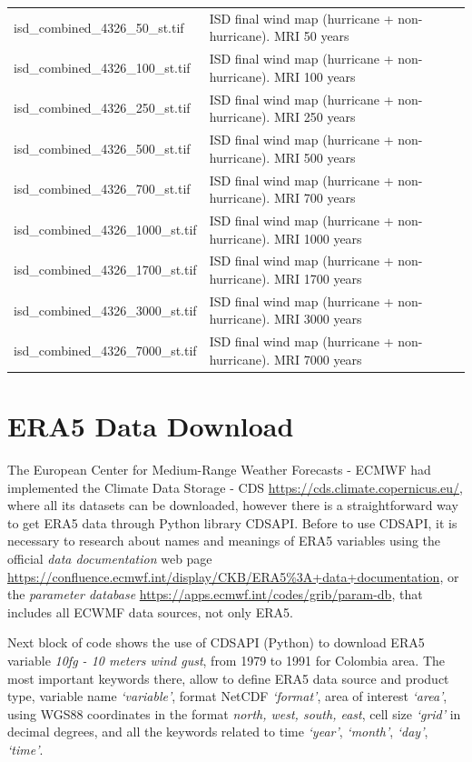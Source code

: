 \documentclass[12pt,oneside]{reedthesis}
\begin{document}
\begin{longtable}[t]{>{\raggedright\arraybackslash}p{2in}>{\raggedright\arraybackslash}p{3.5in}}
isd\_combined\_4326\_50\_st.tif & ISD final wind map (hurricane + non-hurricane). MRI 50 years\\
isd\_combined\_4326\_100\_st.tif & ISD final wind map (hurricane + non-hurricane). MRI 100 years\\
isd\_combined\_4326\_250\_st.tif & ISD final wind map (hurricane + non-hurricane). MRI 250 years\\
isd\_combined\_4326\_500\_st.tif & ISD final wind map (hurricane + non-hurricane). MRI 500 years\\
isd\_combined\_4326\_700\_st.tif & ISD final wind map (hurricane + non-hurricane). MRI 700 years\\
isd\_combined\_4326\_1000\_st.tif & ISD final wind map (hurricane + non-hurricane). MRI 1000 years\\
isd\_combined\_4326\_1700\_st.tif & ISD final wind map (hurricane + non-hurricane). MRI 1700 years\\
isd\_combined\_4326\_3000\_st.tif & ISD final wind map (hurricane + non-hurricane). MRI 3000 years\\
isd\_combined\_4326\_7000\_st.tif & ISD final wind map (hurricane + non-hurricane). MRI 7000 years\\
\bottomrule
\end{longtable}
\endgroup{}

\hypertarget{datadownload}{%
\chapter{ERA5 Data Download}\label{datadownload}}

The European Center for Medium-Range Weather Forecasts - ECMWF had implemented the Climate Data Storage - CDS \url{https://cds.climate.copernicus.eu/}, where all its datasets can be downloaded, however there is a straightforward way to get ERA5 data through Python library CDSAPI. Before to use CDSAPI, it is necessary to research about names and meanings of ERA5 variables using the official \emph{data documentation} web page \url{https://confluence.ecmwf.int/display/CKB/ERA5\%3A+data+documentation}, or the \emph{parameter database} \url{https://apps.ecmwf.int/codes/grib/param-db}, that includes all ECWMF data sources, not only ERA5.

Next block of code shows the use of CDSAPI (Python) to download ERA5 variable \emph{10fg - 10 meters wind gust}, from 1979 to 1991 for Colombia area. The most important keywords there, allow to define ERA5 data source and product type, variable name \emph{`variable'}, format NetCDF \emph{`format'}, area of interest \emph{`area'}, using WGS88 coordinates in the format \emph{north, west, south, east}, cell size \emph{`grid'} in decimal degrees, and all the keywords related to time \emph{`year'}, \emph{`month'}, \emph{`day'}, \emph{`time'}.
\end{document}
